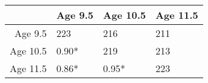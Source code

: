 \begin{table}[ht]
\centering
\begin{tabular}{rlll}
  \hline
 & Age 9.5 & Age 10.5 & Age 11.5 \\ 
  \hline
Age 9.5 & 223 & 216 & 211 \\ 
  Age 10.5 &  0.90*  & 219 & 213 \\ 
  Age 11.5 &  0.86*  &  0.95*  & 223 \\ 
   \hline
\end{tabular}
\end{table}
